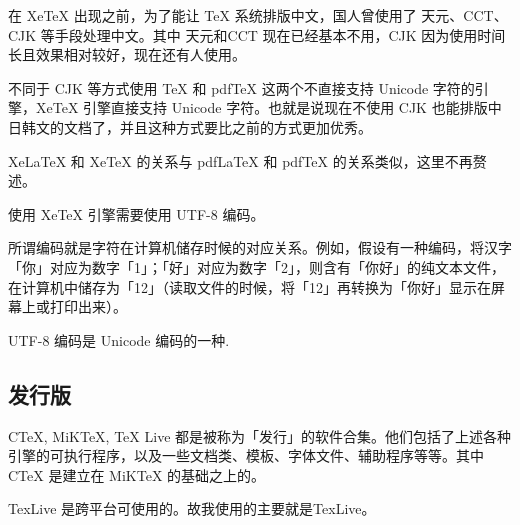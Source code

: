 \documentclass[UTF8]{book}
\begin{document}
{{在 XeTeX 出现之前，为了能让 TeX 系统排版中文，国人曾使用了 天元、CCT、CJK 等手段处理中文。其中 天元和CCT 现在已经基本不用，CJK 因为使用时间长且效果相对较好，现在还有人使用。

不同于 CJK 等方式使用 TeX 和 pdfTeX 这两个不直接支持 Unicode 字符的引擎，XeTeX 引擎直接支持 Unicode 字符。也就是说现在不使用 CJK 也能排版中日韩文的文档了，并且这种方式要比之前的方式更加优秀。

XeLaTeX 和 XeTeX 的关系与 pdfLaTeX 和 pdfTeX 的关系类似，这里不再赘述。

使用 XeTeX 引擎需要使用 UTF-8 编码。

所谓编码就是字符在计算机储存时候的对应关系。例如，假设有一种编码，将汉字「你」对应为数字「1」；「好」对应为数字「2」，则含有「你好」的纯文本文件，在计算机中储存为「12」（读取文件的时候，将「12」再转换为「你好」显示在屏幕上或打印出来）。

UTF-8 编码是 Unicode 编码的一种.
	}
	
	\subsection{发行版}
	CTeX, MiKTeX, TeX Live 都是被称为「发行」的软件合集。他们包括了上述各种引擎的可执行程序，以及一些文档类、模板、字体文件、辅助程序等等。其中 CTeX 是建立在 MiKTeX 的基础之上的。
	
	TexLive 是跨平台可使用的。故我使用的主要就是TexLive。
}
\vspace*{4em}
\end{document}
